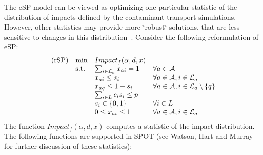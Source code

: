 The eSP model can be viewed as optimizing one particular statistic of the distribution of impacts defined by the contaminant transport simulations. However, other statistics may provide more \char`\"{}robust\char`\"{} solutions, that are less sensitive to changes in this   distribution~\cite{WatHarMur06a}. Consider the following reformulation of eSP: \[ \label{eqn:rSP} \begin{array}{llll} {\rm (rSP)} & \min & Impact_{f}(\alpha,d,x) &\\ & {\rm s.t.} & \sum_{i\in {\cal L}_a} x_{ai} = 1 &\forall a \in {\cal A}\\ & & x_{ai} \le s_i & \forall a \in {\cal A}, i \in {\cal L}_a\\ & & x_{aq} \leq 1-s_i & \forall a \in {\cal A}, i \in {\cal L}_a \setminus \{q\}\\ & & \sum_{i \in L} c_i s_i \le p&\\ & & s_i \in \{0,1\} & \forall i \in L\\ & & 0 \leq x_{ai} \leq 1 & \forall a \in {\cal A}, i \in {\cal L}_a \end{array} \] The function $Impact_ {f}(\alpha,d,x)$ computes a statistic of the impact distribution. The following functions are supported in  SPOT (see Watson, Hart and Murray~\cite{WatHarMur06a} for further discussion of these statistics):   
